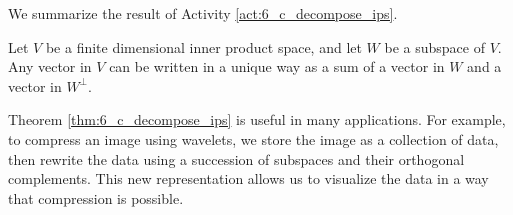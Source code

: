 We summarize the result of Activity \ref{act:6_c_decompose_ips}.

\begin{theorem} \label{thm:6_c_decompose_ips} Let $V$ be a finite dimensional inner product space, and let $W$ be a subspace of $V$. Any vector in $V$ can be written in a unique way as a sum of a vector in $W$ and a vector in $W^{\perp}$. 
\end{theorem}

Theorem \ref{thm:6_c_decompose_ips} is useful in many applications. For example, to compress an image using wavelets, we store the image as a collection of data, then rewrite the data using a succession of subspaces and their orthogonal complements.  This new representation allows us to visualize the data in a way that compression is possible. 


\ExampleIntro

